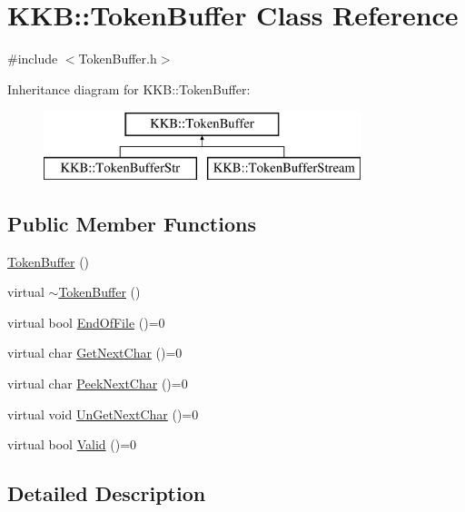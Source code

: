 \hypertarget{class_k_k_b_1_1_token_buffer}{}\section{K\+KB\+:\+:Token\+Buffer Class Reference}
\label{class_k_k_b_1_1_token_buffer}


{\ttfamily \#include $<$Token\+Buffer.\+h$>$}

Inheritance diagram for K\+KB\+:\+:Token\+Buffer\+:\begin{figure}[H]
\begin{center}
\leavevmode
\includegraphics[height=2.000000cm]{class_k_k_b_1_1_token_buffer}
\end{center}
\end{figure}
\subsection*{Public Member Functions}
\begin{DoxyCompactItemize}
\item 
\hyperlink{class_k_k_b_1_1_token_buffer_a9c7f293eaace03fa2cb0f3e5102c9357}{Token\+Buffer} ()
\item 
virtual \hyperlink{class_k_k_b_1_1_token_buffer_a569be7c48bb3336e2252d922048ac232}{$\sim$\+Token\+Buffer} ()
\item 
virtual bool \hyperlink{class_k_k_b_1_1_token_buffer_a6eebb9bf092d9ad21c02f5370cb19af6}{End\+Of\+File} ()=0
\item 
virtual char \hyperlink{class_k_k_b_1_1_token_buffer_a07a50578fa5cfa827636615dab62a94b}{Get\+Next\+Char} ()=0
\item 
virtual char \hyperlink{class_k_k_b_1_1_token_buffer_a6cb0ed637090b4919149454f57006580}{Peek\+Next\+Char} ()=0
\item 
virtual void \hyperlink{class_k_k_b_1_1_token_buffer_a75500b92b04aacd8b1d97c28156e11d1}{Un\+Get\+Next\+Char} ()=0
\item 
virtual bool \hyperlink{class_k_k_b_1_1_token_buffer_ac7ef10355bd2fb7413055ce334901a28}{Valid} ()=0
\end{DoxyCompactItemize}


\subsection{Detailed Description}


